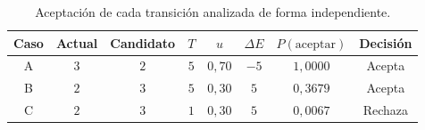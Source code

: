 \begin{table}[H]
\centering
\small
\setlength{\tabcolsep}{6pt}
\renewcommand{\arraystretch}{1.15}
\begin{tabular}{|c|c|c|c|c|c|c|c|}
\hline
\rowcolor{encabezado}\textbf{Caso} & \textbf{Actual} & \textbf{Candidato} & \textbf{$T$} & \textbf{$u$} & \textbf{$\Delta E$} & \textbf{$P(\text{aceptar})$} & \textbf{Decisión} \\
\hline
A & $3$ & $2$ & $5$ & $0{,}70$ & $-5$ & $1{,}0000$ & Acepta \\
\hline
B & $2$ & $3$ & $5$ & $0{,}30$ & $5$ & $0{,}3679$ & Acepta \\
\hline
C & $2$ & $3$ & $1$ & $0{,}30$ & $5$ & $0{,}0067$ & Rechaza \\
\hline
\end{tabular}
\caption{Aceptación de cada transición analizada de forma independiente.}
\label{tab:p3a-casos}
\end{table}
